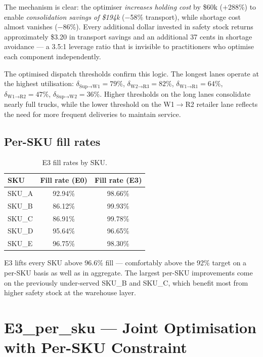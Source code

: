 The mechanism is clear: the optimiser \emph{increases holding cost} by
\$60k ($+$288\%) to enable \emph{consolidation savings of \$194k}
($-$58\% transport), while shortage cost almost vanishes ($-$86\%).
Every additional dollar invested in safety stock returns approximately
\$3.20 in transport savings and an additional 37 cents in shortage
avoidance — a 3.5:1 leverage ratio that is invisible to practitioners
who optimise each component independently.

The optimised dispatch thresholds confirm this logic.  The longest lanes
operate at the highest utilisation:
$\delta_{\text{Sup} \to \text{W1}} = 79\%$,
$\delta_{\text{W2} \to \text{R3}} = 82\%$,
$\delta_{\text{W1} \to \text{R1}} = 64\%$,
$\delta_{\text{W1} \to \text{R2}} = 47\%$,
$\delta_{\text{Sup} \to \text{W2}} = 36\%$.
Higher thresholds on the long lanes consolidate nearly full trucks,
while the lower threshold on the W1$\to$R2 retailer lane reflects the
need for more frequent deliveries to maintain service.

\subsection{Per-SKU fill rates}

\begin{table}[htbp]
  \centering
  \caption{E3 fill rates by SKU.}
  \label{tab:e3-sku}
  \begin{tabular}{@{}lc c@{}}
    \toprule
    SKU & Fill rate (E0) & Fill rate (E3) \\
    \midrule
    SKU\_A & 92.94\% & 98.66\% \\
    SKU\_B & 86.12\% & 99.93\% \\
    SKU\_C & 86.91\% & 99.78\% \\
    SKU\_D & 95.64\% & 96.65\% \\
    SKU\_E & 96.75\% & 98.30\% \\
    \bottomrule
  \end{tabular}
\end{table}

E3 lifts every SKU above 96.6\% fill — comfortably above the 92\% target
on a per-SKU basis as well as in aggregate.  The largest per-SKU
improvements come on the previously under-served SKU\_B and SKU\_C,
which benefit most from higher safety stock at the warehouse layer.

\section{E3\_per\_sku --- Joint Optimisation with Per-SKU Constraint}
\label{sec:results:e3_per_sku}

